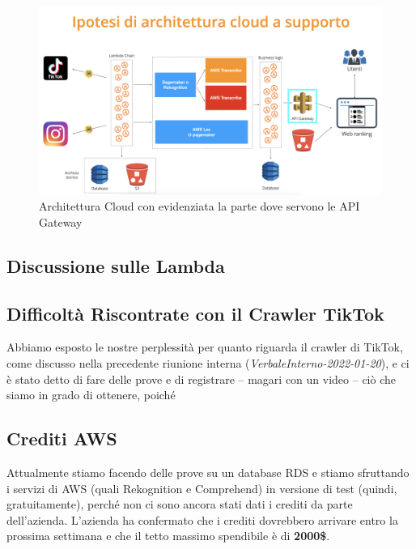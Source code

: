 \begin{figure}[!h]
\centering
\includegraphics[scale=0.35]{Sezioni/images/Architettura.png}
\caption{Architettura Cloud con evidenziata la parte dove servono le API Gateway}
\end{figure}

\subsection{Discussione sulle Lambda}



\subsection{Difficoltà Riscontrate con il Crawler TikTok}

Abbiamo esposto le nostre perplessità per quanto riguarda il crawler di TikTok, come discusso nella precedente riunione interna (\textit{VerbaleInterno-2022-01-20}), e ci è stato detto di fare delle prove e di registrare – magari con un video – ciò che siamo in grado di ottenere, poiché 

\subsection{Crediti AWS}

Attualmente stiamo facendo delle prove su un database RDS e stiamo sfruttando i servizi di AWS (quali Rekognition e Comprehend) in versione di test (quindi, gratuitamente), perché non ci sono ancora stati dati i crediti da parte dell'azienda. L'azienda ha confermato che i crediti dovrebbero arrivare entro la prossima settimana e che il tetto massimo spendibile è di \textbf{2000\$}.

\pagebreak